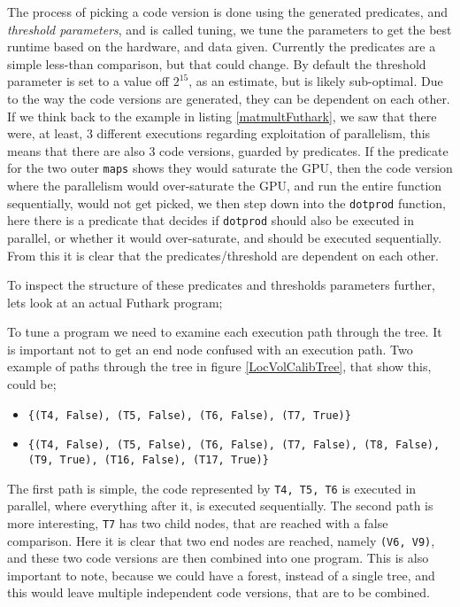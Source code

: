 The process of picking a code version is done using the generated predicates, and \textit{threshold parameters}, and is called tuning, we tune the parameters to get the best runtime based on the hardware, and data given. Currently the predicates are a simple less-than comparison, but that could change. By default the threshold parameter is set to a value off $2^{15}$, as an estimate, but is likely sub-optimal. Due to the way the code versions are generated, they can be dependent on each other. If we think back to the example in listing \ref{matmultFuthark}, we saw that there were, at least, 3 different executions regarding exploitation of parallelism, this means that there are also 3 code versions, guarded by predicates. If the predicate for the two outer \texttt{maps} shows they would saturate the GPU, then the code version where the parallelism would over-saturate the GPU, and run the entire function sequentially, would not get picked, we then step down into the \texttt{dotprod} function, here there is a predicate that decides if \texttt{dotprod} should also be executed in parallel, or whether it would over-saturate, and should be executed sequentially. From this it is clear that the predicates/threshold are dependent on each other.

To inspect the structure of these predicates and thresholds parameters further, lets look at an actual Futhark program;
\begin{center}
	\centering
	
	\label{LocVolCalibTree}
\end{center}
\noindent To tune a program we need to examine each execution path through the tree. It is important not to get an end node confused with an execution path. Two example of paths through the tree in figure \ref{LocVolCalibTree}, that show this, could be;
\begin{itemize}
	\item \texttt{\{(T4, False), (T5, False), (T6, False), (T7, True)\}}
	\item \texttt{\{(T4, False), (T5, False), (T6, False), (T7, False), (T8, False), (T9, True), (T16, False), (T17, True)\}}
\end{itemize}  
The first path is simple, the code represented by \texttt{T4, T5, T6} is executed in parallel, where everything after it, is executed sequentially. The second path is more interesting, \texttt{T7} has two child nodes, that are reached with a false comparison. Here it is clear that two end nodes are reached, namely \texttt{(V6, V9)}, and these two code versions are then combined into one program. This is also important to note, because we could have a forest, instead of a single tree, and this would leave multiple independent code versions, that are to be combined.


